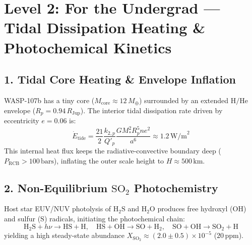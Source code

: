 \documentclass[11pt,a4paper]{article}
\begin{document}
\newpage

\section*{Level 2: For the Undergrad — Tidal Dissipation Heating \& Photochemical Kinetics}

\subsection*{1. Tidal Core Heating \& Envelope Inflation}
WASP-107b has a tiny core ($M_{\text{core}} \approx 12\,M_\oplus$) surrounded by an extended $\mathrm{H/He}$ envelope ($R_p = 0.94\,R_{\text{Jup}}$). The interior tidal dissipation rate driven by eccentricity $e = 0.06$ is:
\begin{equation}
\dot{E}_{\text{tide}} = \frac{21}{2} \frac{k_{2,p}}{Q'_p} \frac{G M_*^2 R_p^5 n e^2}{a^6} \approx 1.2\,\text{W/m}^2
\end{equation}
This internal heat flux keeps the radiative-convective boundary deep ($P_{\text{RCB}} > 100\,\text{bars}$), inflating the outer scale height to $H \approx 500\,\text{km}$.

\subsection*{2. Non-Equilibrium $\mathrm{SO}_2$ Photochemistry}
Host star EUV/NUV photolysis of $\mathrm{H}_2\mathrm{S}$ and $\mathrm{H}_2\mathrm{O}$ produces free hydroxyl ($\mathrm{OH}$) and sulfur ($\mathrm{S}$) radicals, initiating the photochemical chain:
\begin{equation}
\mathrm{H}_2\mathrm{S} + h\nu \to \mathrm{HS} + \mathrm{H}, \quad \mathrm{HS} + \mathrm{OH} \to \mathrm{SO} + \mathrm{H}_2, \quad \mathrm{SO} + \mathrm{OH} \to \mathrm{SO}_2 + \mathrm{H}
\end{equation}
yielding a high steady-state abundance $X_{\mathrm{SO}_2} \approx (2.0 \pm 0.5) \times 10^{-5}$ ($20\,\text{ppm}$).

\newpage

\end{document}
